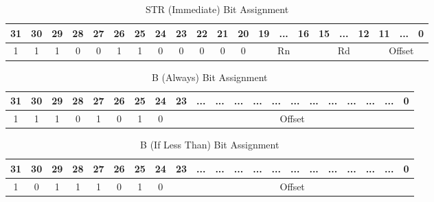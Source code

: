 \begin{table}[h!]
    \centering
    \caption{STR (Immediate) Bit Assignment}
    \label{tab:STRBA}
    \begin{tabular}{|cccc|cccccccc|ccc|ccc|ccc|}
    \hline
    31 & 30 & 29 & 28 & 27 & 26                     & 25                     & 24                     & 23                     & 22                     & 21                     & 20 & 19     & ...    & 16    & 15     & ...    & 12    & 11      & ...      & 0      \\ \hline
    1  & 1  & 1  & 0  & 0  & \multicolumn{1}{c|}{1} & \multicolumn{1}{c|}{1} & \multicolumn{1}{c|}{0} & \multicolumn{1}{c|}{0} & \multicolumn{1}{c|}{0} & \multicolumn{1}{c|}{0} & 0  & \multicolumn{3}{c|}{Rn} & \multicolumn{3}{c|}{Rd} & \multicolumn{3}{c|}{Offset} \\ \hline
    \end{tabular}
\end{table}

\begin{table}[h!]
    \centering
    \caption{B (Always) Bit Assignment}
    \label{tab:BALBA}
    \begin{tabular}{|cccc|cccc|ccllllllllllc|}
    \hline
    31 & 30 & 29 & 28 & 27 & 26 & 25                     & 24 & 23 & ...    &  ...   &   ...  & ... & ... & ... & ... & ... & ... & ... & ... & 0 \\ \hline
    1  & 1  & 1  & 0  & 1  & 0  & \multicolumn{1}{c|}{1} & 0  & \multicolumn{13}{c|}{Offset}                                             \\ \hline
    \end{tabular}
    
\end{table}

\begin{table}[h!]
    \centering
    \caption{B (If Less Than) Bit Assignment}
    \label{tab:BLTBA}
    \begin{tabular}{|cccc|cccc|ccllllllllllc|}
    \hline
    31 & 30 & 29 & 28 & 27 & 26 & 25                     & 24 & 23 & ...    &  ...   &   ...  & ... & ... & ... & ... & ... & ... & ... & ... & 0 \\ \hline
    1  & 0  & 1  & 1  & 1  & 0  & \multicolumn{1}{c|}{1} & 0  & \multicolumn{13}{c|}{Offset}                                             \\ \hline
    \end{tabular}
\end{table}

